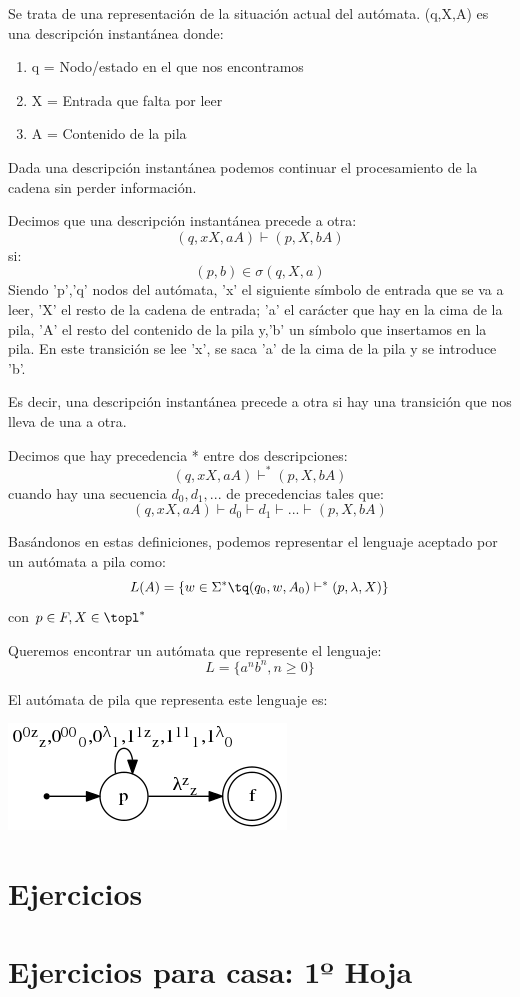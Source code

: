 \documentclass{apuntes}
\begin{document}
\begin{defn}
Se trata de una representación de la situación actual del autómata. (q,X,A) es una descripción instantánea donde:\\
\begin{enumerate}
\item q = Nodo/estado en el que nos encontramos
\item X = Entrada que falta por leer
\item A = Contenido de la pila
\end{enumerate}

Dada una descripción instantánea podemos continuar el procesamiento de la cadena sin perder información.
\end{defn}

\begin{defn}
Decimos que una descripción instantánea precede a otra:
\[(q,xX,aA) \vdash (p, X, bA)\]
si:
\[(p,b) \in \sigma(q, X, a)\]
Siendo 'p','q' nodos del autómata, 'x' el siguiente símbolo de entrada que se va a leer, 'X' el resto de la cadena de entrada; 'a' el carácter que hay en la cima de la pila, 'A' el resto del contenido de la pila y,'b' un símbolo que insertamos en la pila. En este transición se lee 'x', se saca 'a' de la cima de la pila y se introduce 'b'.

Es decir, una descripción instantánea precede a otra si hay una transición que nos lleva de una a otra.

\end{defn}

\begin{defn}[Precedencia *]
Decimos que hay precedencia * entre dos descripciones:
\[(q,xX,aA) \vdash^* (p, X, bA)\]
cuando hay una secuencia $d_0,d_1,...$ de precedencias tales que:
\[(q,xX,aA) \vdash d_0 \vdash d_1 \vdash ... \vdash (p, X, bA)\]
\end{defn}

Basándonos en estas definiciones, podemos representar el lenguaje aceptado por un autómata a pila como:
\[L(A) = \lbrace w \in \Sigma^* \tq (q_0, w, A_0) \vdash^* (p, \lambda, X)\rbrace\]
con $p\in F, X \in \topl^*$

\begin{example}
Queremos encontrar un autómata que represente el lenguaje:
\[L = \lbrace a^nb^n, n \geq 0\rbrace\]

El autómata de pila que representa este lenguaje es:

\begin{center}
\includegraphics[scale=0.75]{automata6.png}
\end{center}
\end{example}


\appendix
\chapter{Ejercicios}


\chapter{Ejercicios para casa: 1º Hoja}



\printindex
\end{document}
